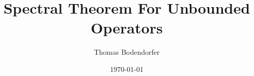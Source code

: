 \documentclass[a4paper,10pt, draft]{article}
\author{Thomas Bodendorfer}
\date{\today}
\title{Spectral Theorem For Unbounded Operators}
\begin{document}
 


\maketitle
\tableofcontents








\nocite{*}

 
\end{document}
